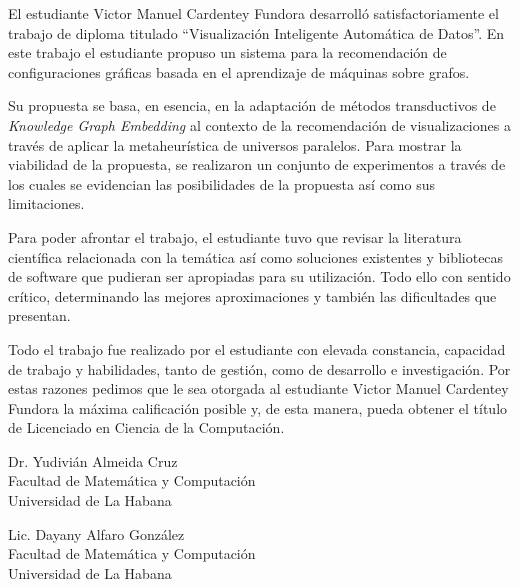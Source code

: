 \begin{opinion}
    El estudiante Victor Manuel Cardentey Fundora desarroll\'o satisfactoriamente el trabajo de
    diploma titulado ``Visualizaci\'on Inteligente Autom\'atica de Datos''. En este trabajo el
    estudiante propuso un sistema para la recomendaci\'on de configuraciones gr\'aficas basada en el
    aprendizaje de m\'aquinas sobre grafos.

    Su propuesta se basa, en esencia, en la adaptaci\'on de m\'etodos transductivos de \textit{Knowledge Graph Embedding}
    al contexto de la recomendaci\'on de visualizaciones a trav\'es de aplicar la metaheur\'istica de universos paralelos. Para 
    mostrar la viabilidad de la propuesta, se realizaron un conjunto de experimentos a trav\'es de los cuales se evidencian las posibilidades
    de la propuesta as\'i como sus limitaciones.

    Para poder afrontar el trabajo, el estudiante tuvo que revisar la literatura cient\'ifica relacionada con la
    tem\'atica as\'i como soluciones existentes y bibliotecas de software que pudieran ser apropiadas para su utilizaci\'on.
    Todo ello con sentido cr\'itico, determinando las mejores aproximaciones y tambi\'en las dificultades que presentan.

    Todo el trabajo fue realizado por el estudiante con elevada constancia, capacidad de trabajo y habilidades, tanto de gesti\'on,
    como de desarrollo e investigaci\'on.
    Por estas razones pedimos que le sea otorgada al estudiante Victor Manuel Cardentey Fundora la m\'axima calificaci\'on posible
    y, de esta manera, pueda obtener el t\'itulo de Licenciado en Ciencia de la Computaci\'on.

    \begin{center}
        Dr. Yudivi\'an Almeida Cruz\\
        Facultad de Matem\'atica y Computaci\'on\\
        Universidad de La Habana\\
    \end{center}

    \begin{center}
        Lic. Dayany Alfaro Gonz\'alez\\
        Facultad de Matem\'atica y Computaci\'on\\
        Universidad de La Habana\\
    \end{center}
   
   
\end{opinion}